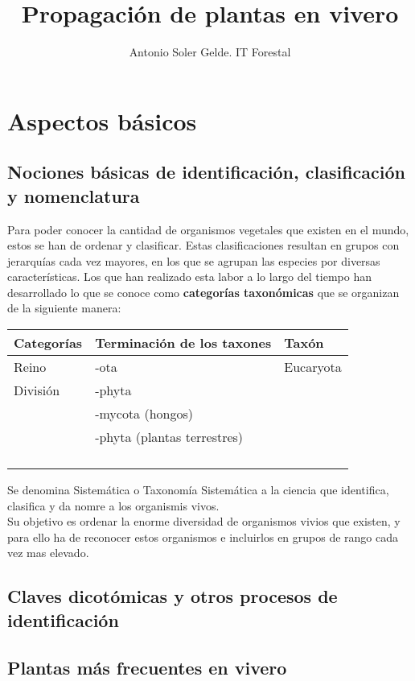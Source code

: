 \documentclass[a4paper,12pt,oneside]{book}
\author{Antonio Soler Gelde. IT Forestal}
\date{}
\title{Propagación de plantas en vivero}
\begin{document}
\maketitle
\tableofcontents


\chapter{Aspectos básicos}
\label{sec:org8448095}
\section{Nociones básicas de identificación, clasificación y nomenclatura}
\label{sec:org64e2d83}
Para poder conocer la cantidad de organismos vegetales que existen en el mundo, estos se
han de ordenar y clasificar. Estas clasificaciones resultan en grupos con jerarquías cada
vez mayores, en los que se agrupan las especies por diversas características. Los que han
realizado esta labor a lo largo del tiempo han desarrollado lo que se conoce como
\textbf{categorías taxonómicas} que se organizan de la siguiente manera: 
\begin{center}
\begin{tabular}{lll}
\textbf{Categorías} & \textbf{Terminación de los taxones} & \textbf{Taxón}\\
\hline
Reino & -ota & Eucaryota\\
División & -phyta & \\
 & -mycota (hongos) & \\
 & -phyta (plantas terrestres) & \\
 &  & \\
 &  & \\
 &  & \\
 &  & \\
\end{tabular}
\end{center}


Se denomina Sistemática o Taxonomía Sistemática a la ciencia que identifica,
clasifica y da nomre a los organismis vivos.\\
Su objetivo es ordenar la enorme diversidad de organismos vivios que existen, y
para ello ha de reconocer estos organismos e incluirlos en grupos de rango cada
vez mas elevado.  
\section{Claves dicotómicas y otros procesos de identificación}
\label{sec:org7d2b90f}
\section{Plantas más frecuentes en vivero}
\label{sec:org47fb70b}
\end{document}
